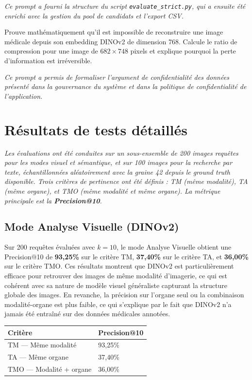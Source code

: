 \documentclass[12pt,a4paper]{article}
\newcommand{\IntroPartie}[1]{%
\vspace{0.2cm}
\begin{center}
\textit{#1}
\end{center}
\vspace{0.3cm}
}
\begin{document}
\textit{Ce prompt a fourni la structure du script \texttt{evaluate\_strict.py},
qui a ensuite été enrichi avec la gestion du pool de candidats et l'export CSV.}

\vspace{0.5cm}

\begin{promptbox}
Prouve mathématiquement qu'il est impossible de reconstruire une image médicale
depuis son embedding DINOv2 de dimension 768. Calcule le ratio de compression
pour une image de $682 \times 748$ pixels et explique pourquoi la perte
d'information est irréversible.
\end{promptbox}

\textit{Ce prompt a permis de formaliser l'argument de confidentialité des données
présenté dans la gouvernance du système et dans la politique de confidentialité
de l'application.}

\section{Résultats de tests détaillés}

\IntroPartie{Les évaluations ont été conduites sur un sous-ensemble de 200 images
requêtes pour les modes visuel et sémantique, et sur 100 images pour la recherche
par texte, échantillonnées aléatoirement avec la graine 42 depuis le ground truth
disponible. Trois critères de pertinence ont été définis : TM (même modalité),
TA (même organe), et TMO (même modalité et même organe). La métrique principale
est la \textbf{Precision@10}.}

\subsection{Mode Analyse Visuelle (DINOv2)}

Sur 200 requêtes évaluées avec $k=10$, le mode Analyse Visuelle obtient une
Precision@10 de \textbf{93,25\%} sur le critère TM, \textbf{37,40\%} sur le
critère TA, et \textbf{36,00\%} sur le critère TMO. Ces résultats montrent que
DINOv2 est particulièrement efficace pour retrouver des images de même modalité
d'imagerie, ce qui est cohérent avec sa nature de modèle visuel généraliste
capturant la structure globale des images. En revanche, la précision sur l'organe
seul ou la combinaison modalité-organe est plus faible, ce qui s'explique par le
fait que DINOv2 n'a jamais été entraîné sur des données médicales annotées.

\begin{center}
\begin{tabularx}{0.7\textwidth}{@{}lX@{}}
\toprule
\textbf{Critère} & \textbf{Precision@10} \\
\midrule
TM — Même modalité          & 93,25\% \\
TA — Même organe            & 37,40\% \\
TMO — Modalité + organe     & 36,00\% \\
\bottomrule
\end{tabularx}
\end{center}
\end{document}

